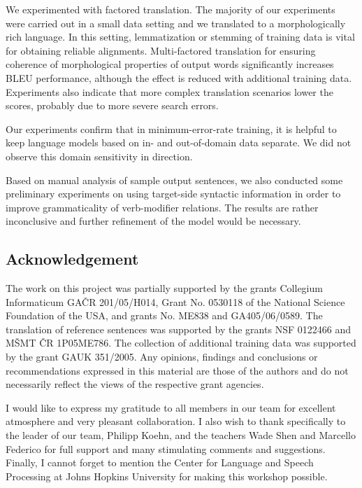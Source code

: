 \documentclass[11pt]{report}
\theoremstyle{plain}
\begin{document}
{{We experimented with factored \tocs{} translation. The majority of our
experiments were carried out in a small data setting and we translated to a
morphologically rich language. In this setting, lemmatization or stemming of
training data is vital for obtaining reliable alignments. Multi-factored
translation for ensuring coherence of morphological properties of output words
significantly increases BLEU performance, although the effect is reduced with
additional training data. Experiments also indicate that more complex
translation scenarios lower the scores, probably due to more severe search
errors.

Our \tocs{} experiments confirm that in minimum-error-rate training, it is
helpful to keep language models based on in- and out-of-domain data separate. We
did not observe this domain sensitivity in \toen{} direction.

Based on manual analysis of sample output sentences, we also conducted some
preliminary experiments on using target-side syntactic information in order to
improve grammaticality of verb-modifier relations.  The results are rather
inconclusive and further refinement of the model would be necessary.



\subsection{Acknowledgement}

The work on this project was partially supported by the grants 
Collegium Informaticum GA\v{C}R 201/05/H014,
Grant No. 0530118 of the National Science Foundation of the USA,
and grants No. ME838 and GA405/06/0589.
The translation of reference sentences was supported by the grants
NSF 0122466 and M\v{S}MT \v{C}R 1P05ME786. The collection of additional training
data was supported by the grant GAUK 351/2005.
Any opinions, findings and conclusions or recommendations expressed in this
material are those of the authors and do not necessarily reflect the views of
the respective grant agencies.

I would like to express my gratitude to all members in our team for excellent
atmosphere and very pleasant collaboration. I also wish to thank specifically to
the leader of our team, Philipp Koehn, and the teachers Wade Shen and Marcello
Federico for full support and many stimulating comments and suggestions.
Finally, I cannot forget to mention the Center for Language and Speech Processing at Johns Hopkins
University for making this workshop possible.


}}
\end{document}
